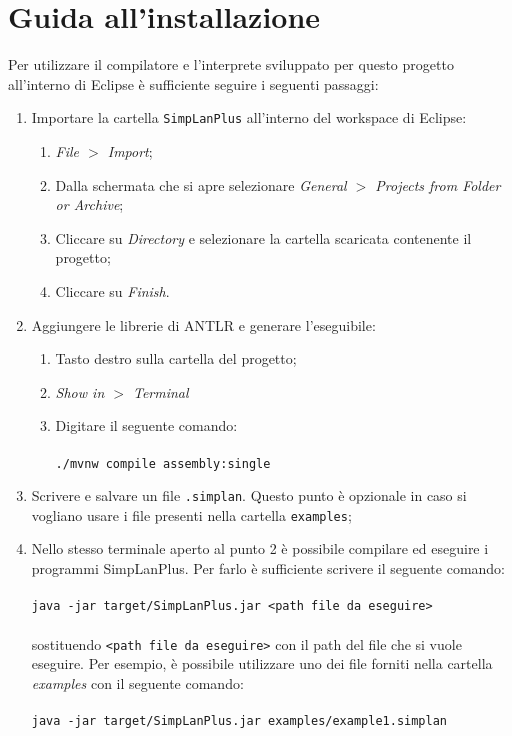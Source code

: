\documentclass[../report.tex]{subfiles}
\begin{document}
\chapter{Guida all'installazione}\label{a:installazione}
Per utilizzare il compilatore e l'interprete sviluppato per questo progetto all'interno di Eclipse è sufficiente seguire i seguenti passaggi:
\begin{enumerate}
    \item Importare la cartella \verb|SimpLanPlus| all'interno del workspace di Eclipse:
        \begin{enumerate}
            \item \textit{File $>$ Import};
            \item Dalla schermata che si apre selezionare \textit{General $>$ Projects from Folder or Archive};
            \item Cliccare su \textit{Directory} e selezionare la cartella scaricata contenente il progetto;
            \item Cliccare su \textit{Finish}.
        \end{enumerate}
    \item Aggiungere le librerie di ANTLR e generare l'eseguibile:
            \begin{enumerate}
                \item Tasto destro sulla cartella del progetto;
                \item \textit{Show in $>$ Terminal}
                \item Digitare il seguente comando:\\\\
                    \verb|./mvnw compile assembly:single|
            \end{enumerate}
    \item Scrivere e salvare un file \verb|.simplan|. Questo punto è opzionale in caso si vogliano usare i file presenti nella cartella \verb|examples|;
    \item \label{a:pt4}Nello stesso terminale aperto al punto 2 è possibile compilare ed eseguire i programmi SimpLanPlus. Per farlo è sufficiente scrivere il seguente comando:\\\\
        \verb|java -jar target/SimpLanPlus.jar <path file da eseguire>|\\\\
        sostituendo \verb|<path file da eseguire>| con il path del file che si vuole eseguire. Per esempio, è possibile utilizzare uno dei file forniti nella cartella \textit{examples} con il seguente comando:\\\\
        \verb|java -jar target/SimpLanPlus.jar examples/example1.simplan|
\end{enumerate}
\end{document}
